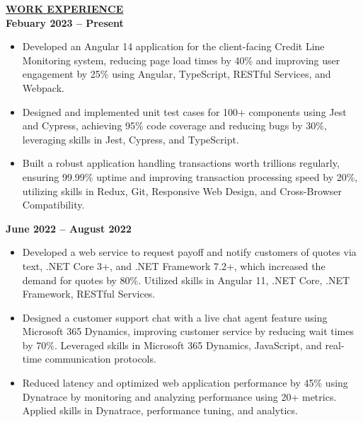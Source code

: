 \documentclass{article}
\begin{document}
\noindent \textbf{\underline{WORK EXPERIENCE}} \\
 \hfill \textbf{Febuary 2023 – Present}
\begin{itemize}[noitemsep,nolistsep,leftmargin=*]
\item Developed an Angular 14 application for the client-facing Credit Line Monitoring system, reducing page load times by 40\% and improving user engagement by 25\% using Angular, TypeScript, RESTful Services, and Webpack.
\item Designed and implemented unit test cases for 100+ components using Jest and Cypress, achieving 95\% code coverage and reducing bugs by 30\%, leveraging skills in Jest, Cypress, and TypeScript.
\item Built a robust application handling transactions worth trillions regularly, ensuring 99.99\% uptime and improving transaction processing speed by 20\%, utilizing skills in Redux, Git, Responsive Web Design, and Cross-Browser Compatibility.
\end{itemize}

\vspace{1mm}

 \hfill \textbf{June 2022 – August 2022}
\begin{itemize}[noitemsep,nolistsep,leftmargin=*]
\item Developed a web service to request payoff and notify customers of quotes via text, .NET Core 3+, and .NET Framework 7.2+, which increased the demand for quotes by 80\%. Utilized skills in Angular 11, .NET Core, .NET Framework, RESTful Services.
\item Designed a customer support chat with a live chat agent feature using Microsoft 365 Dynamics, improving customer service by reducing wait times by 70\%. Leveraged skills in Microsoft 365 Dynamics, JavaScript, and real-time communication protocols.
\item Reduced latency and optimized web application performance by 45\% using Dynatrace by monitoring and analyzing performance using 20+ metrics. Applied skills in Dynatrace, performance tuning, and analytics.
\end{itemize}


\vspace{1mm}
\end{document}
